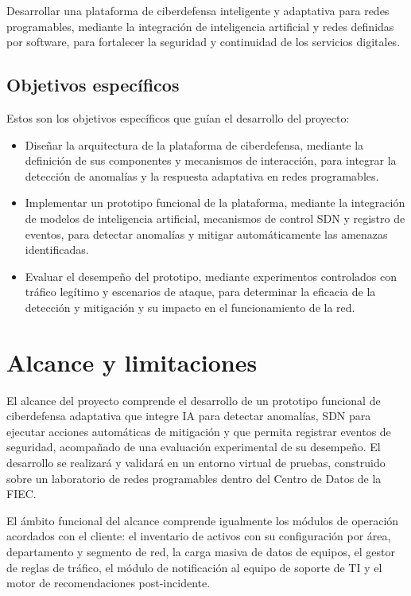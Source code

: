 Desarrollar una plataforma de ciberdefensa inteligente y adaptativa para redes programables, mediante la integraci\'on de inteligencia artificial y redes definidas por software, para fortalecer la seguridad y continuidad de los servicios digitales.

\subsection{Objetivos espec\'ificos}

Estos son los objetivos espec\'ificos que gu\'ian el desarrollo del proyecto:

\begin{itemize}
    \item Diseñar la arquitectura de la plataforma de ciberdefensa, mediante la definici\'on de sus componentes y mecanismos de interacci\'on, para integrar la detecci\'on de anomalías y la respuesta adaptativa en redes programables.
    \item Implementar un prototipo funcional de la plataforma, mediante la integraci\'on de modelos de inteligencia artificial, mecanismos de control SDN y registro de eventos, para detectar anomalías y mitigar autom\'aticamente las amenazas identificadas.
    \item Evaluar el desempeño del prototipo, mediante experimentos controlados con tráfico legítimo y escenarios de ataque, para determinar la eficacia de la detecci\'on y mitigaci\'on y su impacto en el funcionamiento de la red.
\end{itemize}

\section{Alcance y limitaciones}

El alcance del proyecto comprende el desarrollo de un prototipo funcional de ciberdefensa adaptativa que integre IA para detectar anomalías, SDN para ejecutar acciones autom\'aticas de mitigaci\'on y que permita registrar eventos de seguridad, acompañado de una evaluaci\'on experimental de su desempeño. El desarrollo se realizar\'a y validar\'a en un entorno virtual de pruebas, construido sobre un laboratorio de redes programables dentro del Centro de Datos de la FIEC.

El \'ambito funcional del alcance comprende igualmente los m\'odulos de operaci\'on acordados con el cliente: el inventario de activos con su configuraci\'on por \'area, departamento y segmento de red, la carga masiva de datos de equipos, el gestor de reglas de tr\'afico, el m\'odulo de notificaci\'on al equipo de soporte de TI y el motor de recomendaciones post-incidente.


